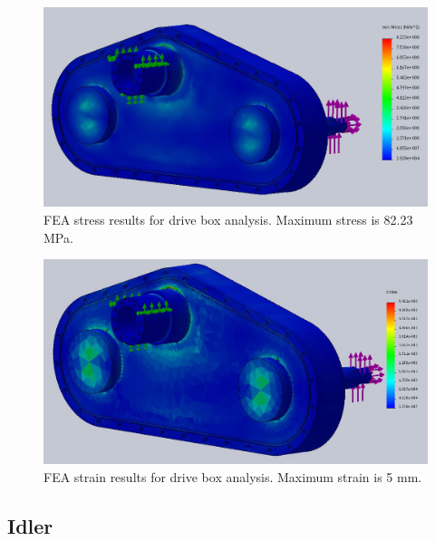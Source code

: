 \begin{figure}[H]
\centering
\includegraphics[width=\textwidth]{images/drive_box_stress_fea}
\caption[Drive Box FEA Stress Results]{FEA stress results for drive box analysis. Maximum stress is 82.23 MPa.}
\label{fig:box_fea1}
\end{figure}

\begin{figure}[H]
\centering
\includegraphics[width=\textwidth]{images/drive_box_strain_fea}
\caption[Drive Box FEA Strain Results]{FEA strain results for drive box analysis. Maximum strain is 5 mm.}
\label{fig:box_fea2}
\end{figure}

\subsection{Idler}\label{sec:idler_fea}

